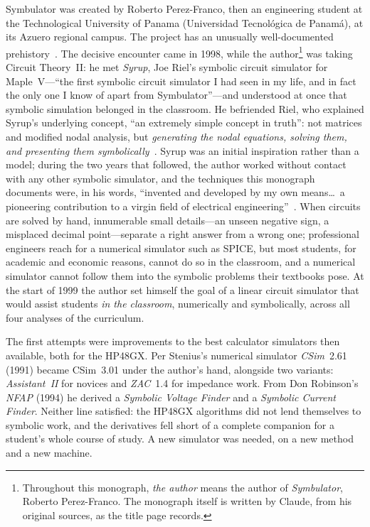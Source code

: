 \documentclass[11pt,oneside]{report}
\begin{document}
Symbulator was created by Roberto Perez-Franco, then an engineering
student at the Technological University of Panama (Universidad
Tecnol\'ogica de Panam\'a), at its Azuero regional campus. The
project has an unusually well-documented prehistory~\cite{paper1999,
thesis2000}. The decisive encounter came in 1998, while the
author\footnote{Throughout this monograph, \emph{the author} means
the author of \emph{Symbulator}, Roberto Perez-Franco. The monograph
itself is written by Claude, from his original sources, as the title
page records.} was taking Circuit Theory~II: he met \emph{Syrup}, Joe Riel's
symbolic circuit simulator for Maple~V---``the first symbolic
circuit simulator I had seen in my life, and in fact the only one I
know of apart from Symbulator''---and understood at once that
symbolic simulation belonged in the classroom. He befriended Riel,
who explained Syrup's underlying concept, ``an extremely simple
concept in truth'': not matrices and modified nodal analysis, but
\emph{generating the nodal equations, solving them, and presenting
them symbolically}~\cite[App.~B]{thesis2000}. Syrup was an initial
inspiration rather than a model; during the two years that followed,
the author worked without contact with any other symbolic simulator,
and the techniques this monograph documents were, in his words,
``invented and developed by my own means\ldots\ a pioneering
contribution to a virgin field of electrical
engineering''~\cite[App.~B]{thesis2000}. When circuits are solved
by hand, innumerable small details---an unseen negative sign, a
misplaced decimal point---separate a right answer from a wrong one;
professional engineers reach for a numerical simulator such as SPICE,
but most students, for academic and economic reasons, cannot do so in
the classroom, and a numerical simulator cannot follow them into the
symbolic problems their textbooks pose. At the start of 1999 the
author set himself the goal of a linear circuit simulator that would
assist students \emph{in the classroom}, numerically and symbolically,
across all four analyses of the curriculum.

The first attempts were improvements to the best calculator simulators
then available, both for the HP48GX. Per Stenius's numerical simulator
\emph{CSim}~2.61 (1991) became CSim~3.01 under the author's hand,
alongside two variants: \emph{Assistant~II} for novices and
\emph{ZAC}~1.4 for impedance work. From Don Robinson's \emph{NFAP}
(1994) he derived a \emph{Symbolic Voltage Finder} and a
\emph{Symbolic Current Finder}. Neither line satisfied: the HP48GX
algorithms did not lend themselves to symbolic work, and the
derivatives fell short of a complete companion for a student's whole
course of study. A new simulator was needed, on a new method and a new
machine.
\end{document}
